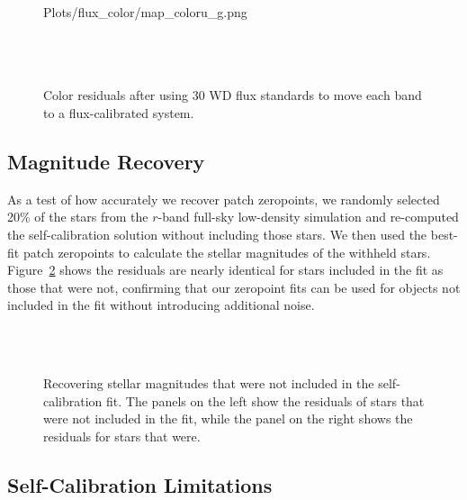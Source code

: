 \documentclass[12pt,preprint]{aastex}
\begin{document}
\begin{figure}
 {Plots/flux_color/map_coloru_g.png} \\
 \\
 \\
 \\
\caption{Color residuals after using 30 WD flux standards to move each band to a flux-calibrated system.   \label{fig:colorcolor}}
\end{figure}

\subsection{Magnitude Recovery}

As a test of how accurately we recover patch zeropoints, we randomly selected 20\% of the stars from the $r$-band full-sky low-density simulation and re-computed the self-calibration solution without including those stars.  We then used the best-fit patch zeropoints to calculate the stellar magnitudes of the withheld stars.  Figure~\ref{fig:zpcheck} shows the residuals are nearly identical for stars included in the fit as those that were not, confirming that our zeropoint fits can be used for objects not included in the fit without introducing additional noise.


\begin{figure}
 \\
 \\
\caption{Recovering stellar magnitudes that were not included in the self-calibration fit.  The panels on the left show the residuals of stars that were not included in the fit, while the panel on the right shows the residuals for stars that were.  \label{fig:zpcheck}}
\end{figure}



\subsection{Self-Calibration Limitations}
\end{document}
